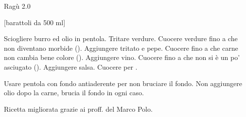 \begin{recipe}[label=ragu]{Ragù 2.0}
    \begin{header}
        [barattoli da 500 ml]
    
    \end{header}
    
    \begin{ingredients}[10]
    \end{ingredients}
    
    \begin{preparation}
        \step Sciogliere burro ed olio in pentola.
        \step Tritare verdure.
        \step Cuocere verdure fino a che non diventano morbide ().
        \step Aggiungere tritato e pepe.
        \step Cuocere fino a che carne non cambia bene colore ().
        \step Aggiungere vino.
        \step Cuocere fino a che non si è un po' asciugato ().
        \step Aggiungere salsa.
        \step Cuocere per .
    \end{preparation}
    
    \begin{suggestion}[1cm]
        \suggestionMark Usare pentola con fondo antiaderente per non bruciare il fondo.
        \suggestionMark Non aggiungere olio dopo la carne, brucia il fondo in ogni caso.
    \end{suggestion}
    
    \begin{hint}
        Ricetta migliorata grazie ai proff. del Marco Polo.
    \end{hint}
    
\end{recipe}
